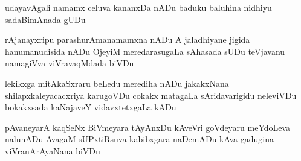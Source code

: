 \documentclass{article}
\begin{document}
\obeylines
{\LARGE
\begin{flushleft}	
udayavAgali namamx celuva kananxDa nADu
baduku baluhina nidhiyu sadaBimAnada gUDu
\end{flushleft}	

\smallskip
\begin{flushright}
rAjanayxripu parashurAmanamamxna nADu
A jaladhiyane jigida hanumanudisida nADu
OjeyiM meredarasugaLa sAhasada sUDu
teVjavanu namagiVva viVravaqMdada biVDu
\end{flushright}

\smallskip
\begin{flushleft}
lekikxga mitAkaSxraru beLedu merediha nADu
jakakxNana shilapxkaleyacacxriya karugoVDu
cokakx matagaLa sAridavarigidu neleviVDu
bokakxsada kaNajaveY vidavxtetxgaLa kADu
\end{flushleft}

\smallskip
\begin{flushright}
pAvaneyarA kaqSeNx BiVmeyara tAyAnxDu
kAveVri goVdeyaru meYdoLeva nalunADu
AvagaM sUPxtiRsuva kabibxgara naDemADu
kAva gadugina viVranArAyaNana biVDu
\end{flushright}}
\medskip

\end{document}

